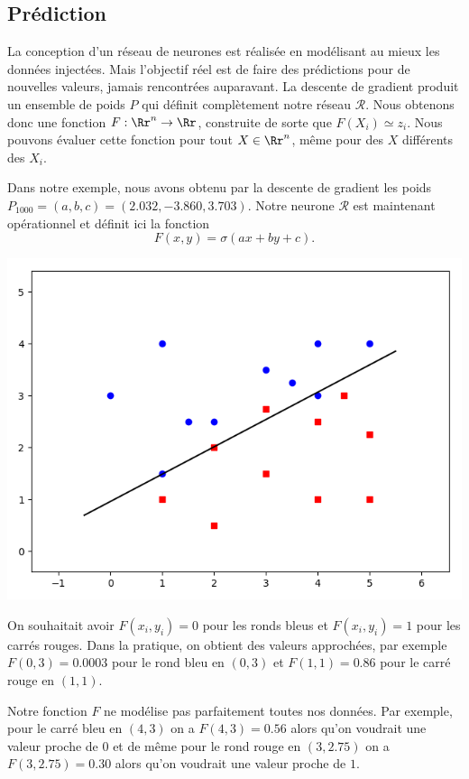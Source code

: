 \documentclass[11pt,class=report,crop=false]{standalone}
\begin{document}
\subsection{Prédiction}

La conception d'un réseau de neurones est réalisée en modélisant au mieux les données injectées. Mais l'objectif réel est de faire des prédictions pour de nouvelles valeurs, jamais rencontrées auparavant.
La descente de gradient produit un ensemble de poids $P$ qui définit complètement notre réseau $\mathcal{R}$.
Nous obtenons donc une fonction $F : \Rr^n \to \Rr$, construite de sorte que $F(X_i) \simeq z_i$.
Nous pouvons évaluer cette fonction pour tout $X \in \Rr^n$, même pour des $X$ différents des $X_i$.


\begin{exemple}
Dans notre exemple, nous avons obtenu par la descente de gradient les poids $P_{1000} = (a,b,c) = (2.032, -3.860, 3.703)$.
Notre neurone $\mathcal{R}$ est maintenant opérationnel et définit ici la fonction 
$$F(x,y) = \sigma(ax+by+c).$$

\begin{center}
\includegraphics[scale=\myscale,scale=0.45]{figures/retro_01_e}
\end{center}

On souhaitait avoir $F(x_i,y_i)=0$ pour les ronds bleus et $F(x_i,y_i)=1$ pour les carrés rouges.
Dans la pratique, on obtient des valeurs approchées, par exemple $F(0,3)=0.0003$ pour le rond bleu en $(0,3)$ et $F(1,1)=0.86$ pour le carré rouge en $(1,1)$.

Notre fonction $F$ ne modélise pas parfaitement toutes nos données. Par exemple, pour le carré bleu en $(4,3)$ on a $F(4,3) = 0.56$ alors qu'on voudrait une valeur proche de $0$ et de même pour le rond rouge en $(3,2.75)$ on a $F(3,2.75) = 0.30$ alors qu'on voudrait une valeur proche de $1$. 


\end{exemple}
\end{document}
